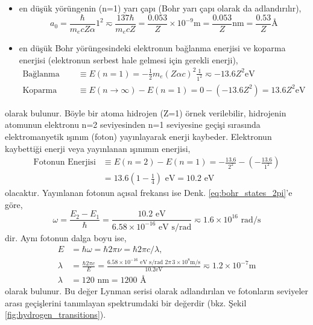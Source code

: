 \documentclass[a4paper,12pt, twoside]{article}
\begin{document}
\begin{itemize}
\item en düşük yörüngenin (n=1) yarı çapı (Bohr yarı çapı olarak da adlandırılır),
\begin{equation}
a_0 = \frac{\hbar}{m_e c Z \alpha} 1^2 \eqsim \frac{137\hbar}{m_e c Z} = \frac{0.053}{Z}\times 10^{-9} \text{m} = \frac{0.053}{Z} \text{nm} = \frac{0.53}{Z} \text{\AA}
\label{eq:bohr_radius}
\end{equation}

\item en düşük Bohr yörüngesindeki elektronun bağlanma enerjisi ve koparma enerjisi (elektronun serbest hale gelmesi için gerekli enerji),
\begin{align}
\text{Bağlanma Enerjisi} &\equiv E(n=1) = -\frac{1}{2}m_e (Z \alpha c)^2 \frac{1}{1^2} \eqsim -13.6 Z^2 \text{eV} \\
\text{Koparma Enerjisi} &\equiv E(n\rightarrow\infty) - E(n=1) = 0 - (-13.6 Z^2) = 13.6 Z^2 \text{eV}
\label{eq:bindingEnergy}
\end{align}
\end{itemize}
olarak bulunur. Böyle bir atoma hidrojen (Z=1) örnek verilebilir, hidrojenin atomunun elektronu n=2 seviyesinden n=1 seviyesine geçişi sırasında elektromanyetik ışınım (foton) yayınlayarak enerji kaybeder. Elektronun kaybettiği enerji veya yayınlanan ışınımın enerjisi,
\begin{align}
\text{Fotonun Enerjisi} &\equiv E(n=2) - E(n=1) 
= -\frac{13.6}{2^2} - (-\frac{13.6}{1^2}) \nonumber \\ 
&=  13.6 (1-\frac{1}{4}) \text{ eV} = 10.2 \text{ eV}
\label{eq:fotonEnergy}
\end{align}
olacaktır. Yayınlanan fotonun açısal frekansı ise Denk. \ref{eq:bohr_states_2pi}'e göre,
\begin{equation*}
\omega = \frac{E_2 - E_1}{\hbar} = \frac{10.2 \text{ eV}}{6.58\times 10^{-16} \text{ eV s/rad}} \eqsim 1.6 \times 10^{16} \text{ rad/s}
\end{equation*}
dir. Aynı fotonun dalga boyu ise,
\begin{align*}
E &= \hbar \omega = \hbar 2\pi \nu = \hbar 2\pi c/\lambda, \\
\lambda &= \frac{\hbar 2\pi c}{E} = 
\frac{6.58\times 10^{-16} \text{ eV s/rad } 2\pi\,3\times 10^8 \text{m/s}}{10.2 \text{eV}}\eqsim 1.2\times 10^{-7} \text{m}\\
\lambda &= 120 \text{ nm} = 1200 \text{ \AA} 
\end{align*}
olarak bulunur. Bu değer Lynman serisi olarak adlandırılan ve fotonların seviyeler arası geçişlerini tanımlayan spektrumdaki bir değerdir (bkz. Şekil \ref{fig:hydrogen_transitions}).
\end{document}
